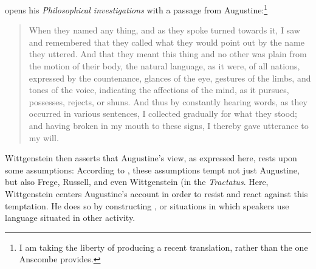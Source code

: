 \documentclass[doc,12pt,apacite,biblatex]{apa6}
\begin{document}
 opens his \emph{Philosophical investigations} with a
passage from Augustine:\footnote{I am taking the liberty of producing a recent
translation, rather than the one Anscombe provides.} \begin{quote} When they
	named any thing, and as they spoke turned towards it, I saw and
	remembered that they called what they would point out by the name they
	uttered. And that they meant this thing and no other was plain from the
	motion of their body, the natural language, as it were, of all nations,
	expressed by the countenance, glances of the eye, gestures of the
	limbs, and tones of the voice, indicating the affections of the mind,
	as it pursues, possesses, rejects, or shuns. And thus by constantly
	hearing words, as they occurred in various sentences, I collected
	gradually for what they stood; and having broken in my mouth to these
	signs, I thereby gave utterance to my will.  \cite[\S~1.8.13]{Pusey09}
\end{quote}
Wittgenstein then asserts that Augustine's view, as expressed here,
rests upon some assumptions: 
According to \cite{McGinn97}, these assumptions tempt not just Augustine, but
also Frege, Russell, and even Wittgenstein (in the \emph{Tractatus}. 
Here, Wittgenstein centers 
Augustine's account in order to resist and react against
this temptation. He does so by constructing , or situations
in which speakers use language situated in other activity.
\end{document}
